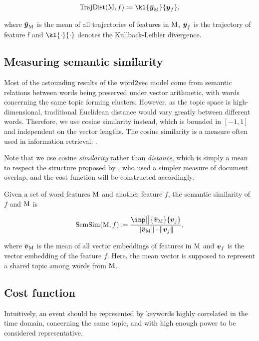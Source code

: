 \begin{equation}
	\trajdist( \featset, f ) \coloneqq \kl{\vect{\bar{\traj}}_{\featset}}{\vect{\traj}_{f}},
\end{equation}

where $\vect{\bar{\traj}}_{\featset}$ is the mean of all trajectories of features in $\text{M}$, $\vect{\traj}_{f}$ is the trajectory of feature f and $\kl{\cdot}{\cdot}$ denotes the Kullback-Leibler divergence.


\subsection{Measuring semantic similarity}
Most of the astounding results of the word2vec model come from semantic relations between words being preserved under vector arithmetic, with words concerning the same topic forming clusters. However, as the topic space is high-dimensional, traditional Euclidean distance would vary greatly between different words. Therefore, we use cosine similarity instead, which is bounded in $[-1, 1]$ and independent on the vector lengths. The cosine similarity is a measure often used in information retrieval: \cite{cosine-similarity-i, cosine-similarity-ii}.

Note that we use cosine \textit{similarity} rather than \textit{distance}, which is simply a mean to respect the structure proposed by \cite{event-detection}, who used a simpler measure of document overlap, and the cost function will be constructed accordingly.

Given a set of word features $\text{M}$ and another feature $f$, the semantic similarity of $f$ and $\text{M}$ is

\begin{equation}
	\semsim( \featset, f ) \coloneqq \frac{\inp[\big]{\bar{\embed}_{\featset}}{\embed_{j}}}{\| \bar{\embed}_{\featset} \| \cdot \| \embed_{j} \|},
\end{equation}

where $\bar{\embed}_{\featset}$ is the mean of all vector embeddings of features in $\text{M}$ and $\embed_{f}$ is the vector embedding of the feature $f$. Here, the mean vector is supposed to represent a shared topic among words from $\text{M}$.


\subsection{Cost function}
Intuitively, an event should be represented by keywords highly correlated in the time domain, concerning the same topic, and with high enough power to be considered representative.

